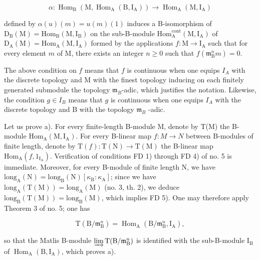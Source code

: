 \[
\alpha : \operatorname{Hom} _ {\mathrm{B}} (\mathrm{M}, \operatorname{Hom} _ {\mathrm{A}} (\mathrm{B}, \mathrm{I} _ {\mathrm{A}})) \longrightarrow \operatorname{Hom} _ {\mathrm{A}} (\mathrm{M}, \mathrm{I} _ {\mathrm{A}})
\]

defined by \(\alpha(u)(m)=u(m)(1)\) induces a B-isomorphism of \(\mathrm{D}_{\mathrm{B}}(\mathrm{M})=\mathrm{Hom}_{\mathrm{B}}(\mathrm{M},\mathrm{I}_{\mathrm{B}})\) on the sub-B-module \(\mathrm{Hom}_{\mathrm{A}}^{\mathrm{cont}}(\mathrm{M},\mathrm{I}_{\mathrm{A}})\) of \(\mathrm{D}_{\mathrm{A}}(\mathrm{M})=\mathrm{Hom}_{\mathrm{A}}(\mathrm{M},\mathrm{I}_{\mathrm{A}})\) formed by the applications \(f:\mathrm{M}\to\mathrm{I}_{\mathrm{A}}\) such that for every element \(m\) of M, there exists an integer \(n\geqslant0\) such that \(f(\mathfrak{m}_{\mathrm{B}}^{n}m)=0\).

The above condition on \(f\) means that \(f\) is continuous when one equips \(I_A\) with the discrete topology and M with the finest topology inducing on each finitely generated submodule the topology \(\mathfrak{m}_B\)-adic, which justifies the notation. Likewise, the condition \(g \in I_B\) means that \(g\) is continuous when one equips \(I_A\) with the discrete topology and B with the topology \(\mathfrak{m}_B\) -adic.

Let us prove a). For every finite-length B-module M, denote by T(M) the B-module \(\mathrm{Hom}_{\mathrm{A}}(\mathrm{M},\mathrm{I}_{\mathrm{A}})\). For every B-linear map \(f:M\to N\) between B-modules of finite length, denote by \(\mathrm{T}(f):\mathrm{T}(\mathrm{N})\to\mathrm{T}(\mathrm{M})\) the B-linear map \(\mathrm{Hom}_{\mathrm{A}}(f,1_{\mathrm{I}_{\mathrm{A}}})\). Verification of conditions FD 1) through FD 4) of no. 5 is immediate. Moreover, for every B-module of finite length N, we have \(\mathrm{long}_{\mathrm{A}}(\mathrm{N})=\mathrm{long}_{\mathrm{B}}(\mathrm{N})\left[\kappa_{\mathrm{B}}:\kappa_{\mathrm{A}}\right]\); since we have \(\mathrm{long}_{\mathrm{A}}(\mathrm{T}(\mathrm{M}))=\mathrm{long}_{\mathrm{A}}(\mathrm{M})\) (no. 3, th. 2), we deduce \(\mathrm{long}_{\mathrm{B}}(\mathrm{T}(\mathrm{M}))=\mathrm{long}_{\mathrm{B}}(\mathrm{M})\), which implies FD 5). One may therefore apply Theorem 3 of no. 5; one has

\[
\mathrm{T} (\mathrm{B} / \mathfrak {m} _ {\mathrm{B}} ^ {n}) = \operatorname{Hom} _ {\mathrm{A}} (\mathrm{B} / \mathfrak {m} _ {\mathrm{B}} ^ {n}, \mathrm{I} _ {\mathrm{A}}),
\]

so that the Matlis B-module \(\varinjlim\mathrm{T}(\mathrm{B}/\mathfrak{m}_{\mathrm{B}}^{n})\) is identified with the sub-B-module \(\mathrm{I}_{\mathrm{B}}\) of \(\operatorname{Hom}_{\mathrm{A}}(\mathrm{B},\mathrm{I}_{\mathrm{A}})\), which proves a).

